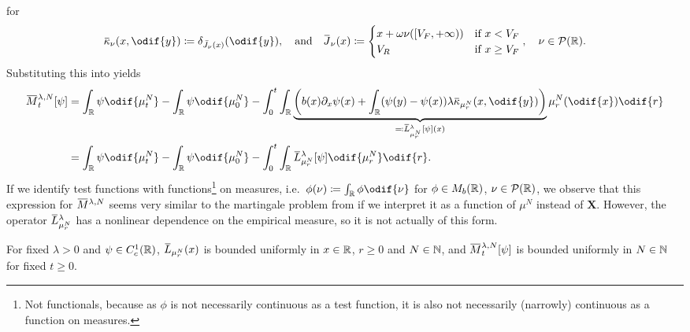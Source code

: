 for
\begin{equation}\label{eq:ol-kappa-ol-J-def}
  \ol{\kappa}_\nu(x, \odif{y}) \coloneqq \delta_{\bar{\jtarg}_\nu(x)}(\odif{y}),
  \quad\text{and}\quad
  \ol{\jtarg}_\nu(x) \coloneqq \begin{cases}
    x + \omega \nu([V_F,+\infty)) & \text{if } x < V_F    \\
    V_R                           & \text{if } x \geq V_F
  \end{cases}, \quad \nu \in \cP(\potspace).
\end{equation}
Substituting this into  yields
\begin{equation}\label{eq:emp-M-expression}
  \begin{split}
    \ol{M}_t^{\lambda, N}[\psi]
     & = \int_\potspace \psi \odif{\mu_t^N} - \int_\potspace \psi \odif{\mu_0^N}
    - \int_0^t \int_\potspace \underbrace{\br*{ b(x) \partial_x \psi(x) + \int_\potspace (\psi(y) - \psi(x)) \lambda \ol{\kappa}_{\mu_{r}^N}(x, \odif{y}) }}_{\eqqcolon \ol{L}_{\mu_{r}^N}^{\lambda} [\psi](x)} \mu_{r}^N(\odif{x}) \odif{r} \\
     & = \int_\potspace \psi \odif{\mu_t^N} - \int_\potspace \psi \odif{\mu_0^N}
    - \int_0^t \int_\potspace \ol{L}_{\mu_{r}^N}^{\lambda} [\psi] \odif{\mu_{r}^N} \odif{r}.
  \end{split}
\end{equation}
If we identify test functions with functions\footnote{Not functionals, because as \( \phi \) is not necessarily continuous as a test function, it is also not necessarily (narrowly) continuous as a function on measures.} on measures, i.e.\ \( \phi(\nu) \coloneqq \int_\potspace \phi \odif{\nu} \) for \(\phi \in M_b(\mathbb{R})\), \( \nu \in \mathcal{P}(\mathbb{R}) \), we observe that this expression for \(\ol{M}^{\lambda,N}\) seems very similar to the martingale problem from  if we interpret it as a function of \(\mu^N\) instead of \(\bm{X}\).
However, the operator \(\ol{L}_{\mu_{r}^N}^{\lambda}\) has a nonlinear dependence on the empirical measure, so it is not actually of this form.

\begin{lemma}\label{lem:emp-mart-bounded}
  For fixed \( \lambda > 0 \) and \( \psi \in C_c^1(\mathbb{R}) \), \( \ol{L}_{\mu_{r}^N}(x) \) is bounded uniformly in \( x \in \mathbb{R} \), \( r \geq 0 \) and \( N \in \mathbb{N} \), and \( \ol{M}_t^{\lambda, N}[\psi] \) is bounded uniformly in \( N \in \mathbb{N} \) for fixed \( t \geq 0 \).
\end{lemma}

